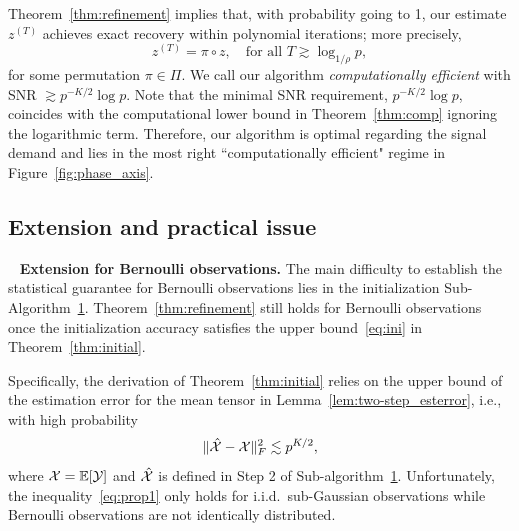 \documentclass[lettersize,onecolumn,journal]{IEEEtran}
\theoremstyle{definition}
\theoremstyle{definition}
\begin{document}
Theorem~\ref{thm:refinement} implies that, with probability going to 1, our estimate $z^{(T)}$ achieves exact recovery within polynomial iterations; more precisely,
\begin{equation}
     z^{(T)} = \pi \circ z, \quad \text{for all }T\gtrsim \log_{1/\rho} p,
\end{equation}
for some permutation $\pi \in \Pi$. {
\color{blue} We call our algorithm \textit{computationally efficient} with SNR $\gtrsim p^{-K/2} \log p$. Note that the minimal SNR requirement, $p^{-K/2 }\log p$, coincides with the computational lower bound in Theorem~\ref{thm:comp} ignoring the logarithmic term. Therefore, our algorithm is optimal regarding the signal demand and lies in the most right ``computationally efficient" regime in Figure~\ref{fig:phase_axis}.
}


{
\color{blue}
\subsection{Extension and practical issue}~\label{subsec:exten}
{\bf Extension for Bernoulli observations.} The main difficulty to establish the statistical guarantee for Bernoulli observations lies in the initialization Sub-Algorithm~\hyperref[alg:main]{1}. Theorem~\ref{thm:refinement} still holds for Bernoulli observations once the initialization accuracy satisfies the upper bound~\eqref{eq:ini} in Theorem~\ref{thm:initial}.

Specifically, the derivation of Theorem~\ref{thm:initial} relies on the upper bound of the estimation error for the mean tensor in Lemma~\ref{lem:two-step_esterror}, i.e., with high probability
\begin{equation}\label{eq:prop1}
    \onormSize{}{\hat \tX - \tX}_F^2 \lesssim p^{K/2},
\end{equation}
where $\mathcal{X} = \mathbb{E}[\mathcal{Y}]$ and $\hat {\mathcal{X}}$ is defined in Step 2 of Sub-algorithm~\hyperref[alg:main]{1}. Unfortunately, the inequality~\eqref{eq:prop1} only holds for i.i.d.\ sub-Gaussian observations while Bernoulli observations are not identically distributed.  

}
\end{document}
